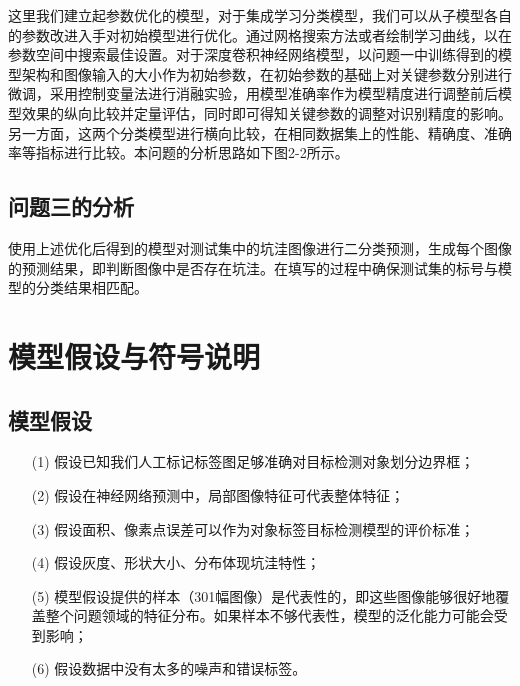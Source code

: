 \documentclass[a4paper, 10pt]{article}
\begin{document}
	这里我们建立起参数优化的模型，对于集成学习分类模型，我们可以从子模型各自的参数改进入手对初始模型进行优化。通过网格搜索方法或者绘制学习曲线，以在参数空间中搜索最佳设置。对于深度卷积神经网络模型，以问题一中训练得到的模型架构和图像输入的大小作为初始参数，在初始参数的基础上对关键参数分别进行微调，采用控制变量法进行消融实验，用模型准确率作为模型精度进行调整前后模型效果的纵向比较并定量评估，同时即可得知关键参数的调整对识别精度的影响。另一方面，这两个分类模型进行横向比较，在相同数据集上的性能、精确度、准确率等指标进行比较。本问题的分析思路如下图2-2所示。
	
	\subsection{问题三的分析}
	
	使用上述优化后得到的模型对测试集中的坑洼图像进行二分类预测，生成每个图像的预测结果，即判断图像中是否存在坑洼。在填写的过程中确保测试集的标号与模型的分类结果相匹配。
	
	\section{模型假设与符号说明}
	
	\subsection{模型假设}
	
	\begin{itemize}
		\item [(1)]
		假设已知我们人工标记标签图足够准确对目标检测对象划分边界框；
		
		\item [(2)]
		假设在神经网络预测中，局部图像特征可代表整体特征；
		
		\item[(3)]
		假设面积、像素点误差可以作为对象标签目标检测模型的评价标准；
		
		\item[(4)]
		假设灰度、形状大小、分布体现坑洼特性；
		
		\item[(5)]
		模型假设提供的样本（301幅图像）是代表性的，即这些图像能够很好地覆盖整个问题领域的特征分布。如果样本不够代表性，模型的泛化能力可能会受到影响；
		
		\item[(6)]
		假设数据中没有太多的噪声和错误标签。
		
	\end{itemize}
	
\end{document}
